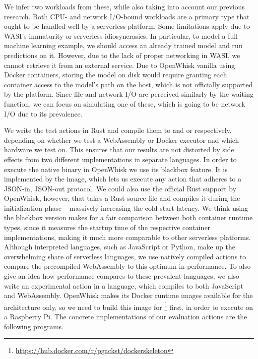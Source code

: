 We infer two workloads from these, while also taking into account our previous research. Both CPU- and network I/O-bound workloads are a primary type that ought to be handled well by a serverless platform. Some limitations apply due to WASI's immaturity or serverless idiosyncrasies. In particular, to model a full machine learning example, we should access an already trained model and run predictions on it. However, due to the lack of proper networking in WASI, we cannot retrieve it from an external service. Due to OpenWhisk vanilla using Docker containers, storing the model on disk would require granting each container access to the model's path on the host, which is not officially supported by the platform. Since file and network I/O are perceived similarly by the waiting function, we can focus on simulating one of these, which is going to be network I/O due to its prevalence.

We write the test actions in Rust and compile them to  and  or  respectively, depending on whether we test a WebAssembly or Docker executor and which hardware we test on. This ensures that our results are not distorted by side effects from two different implementations in separate languages. In order to execute the native binary in OpenWhisk we use its blackbox feature. It is implemented by the  image, which lets us execute any action that adheres to a JSON-in, JSON-out protocol. We could also use the official Rust support by OpenWhisk, however, that takes a Rust source file and compiles it during the initialization phase -- massively increasing the cold start latency. We think using the blackbox version makes for a fair comparison between both container runtime types, since it measures the startup time of the respective container implementations, making it much more comparable to other serverless platforms. Although interpreted languages, such as JavaScript or Python, make up the overwhelming share of serverless languages, we use natively compiled actions to compare the precompiled WebAssembly to this optimum in performance. To also give an idea how performance compares to these prevalent languages, we also write an experimental action in a language, which compiles to both JavaScript and WebAssembly.
OpenWhisk makes its Docker runtime images available for the  architecture only, so we need to build this image for \footnote{\url{https://hub.docker.com/r/pgackst/dockerskeleton}} first, in order to execute on a Raspberry Pi. The concrete implementations of our evaluation actions are the following programs.

